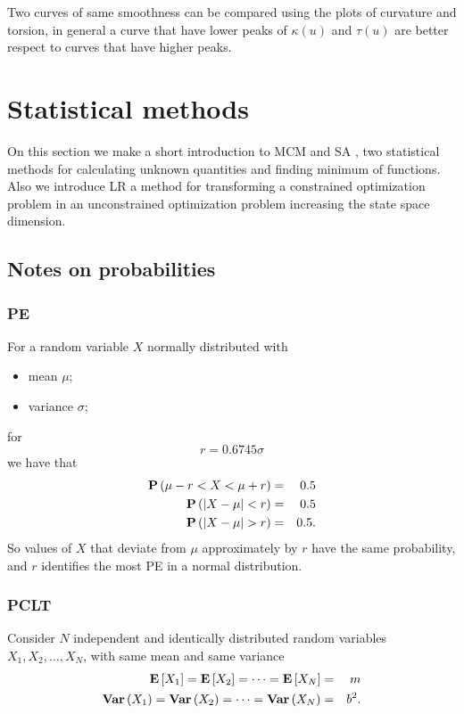 \documentclass[dissertation.tex]{subfiles}
\begin{document}
Two curves of same smoothness can be compared using the plots of
curvature and torsion, in general a curve that have lower peaks of
$\kappa(u)$ and $\tau(u)$ are better respect to curves that have
higher peaks.

\section{Statistical methods}
On this section we make a short introduction to \ac{MCM}
\cite{metropolis}\cite{sobol}\cite{newman} and \ac{SA} \cite{kirkpatrick}\cite{ho},
two statistical methods for calculating unknown quantities and finding
minimum of functions. Also we introduce \ac{LR} \cite{benjamin} a
method for transforming a constrained optimization problem in an
unconstrained optimization problem increasing the state space
dimension.
\subsection{Notes on probabilities}
\subsubsection{\ac{PE}}
For a random variable $X$ normally distributed with
\begin{itemize}
\item mean $\mu$;
\item variance $\sigma$;
\end{itemize}
for
\begin{equation*}
  r=0.6745\sigma
\end{equation*}
we have that
\begin{eqnarray*}
  \prob{\mu-r<X<\mu+r} &=& 0.5\\
  \prob{\abs{X-\mu}<r} &=& 0.5\\
  \prob{\abs{X-\mu}>r} &=& 0.5.
\end{eqnarray*}
So values of $X$ that deviate from $\mu$ approximately by $r$ have the
same probability, and $r$ identifies the most \ac{PE} in a
normal distribution.
\subsubsection{\acf{PCLT}}
Consider $N$ independent and identically distributed random variables
$X_1,X_2,\dots,X_N$, with same mean and same variance
\begin{eqnarray*}
  \mathrm{\textbf{E}}\left[X_1\right]=\mathrm{\textbf{E}}\left[X_2\right]=\dots=\mathrm{\textbf{E}}\left[X_N\right]&=&m\\
  \mathrm{\textbf{Var}}\left(X_1\right)=\mathrm{\textbf{Var}}\left(X_2\right)=\dots=\mathrm{\textbf{Var}}\left(X_N\right)&=&b^2.
\end{eqnarray*}
\end{document}

